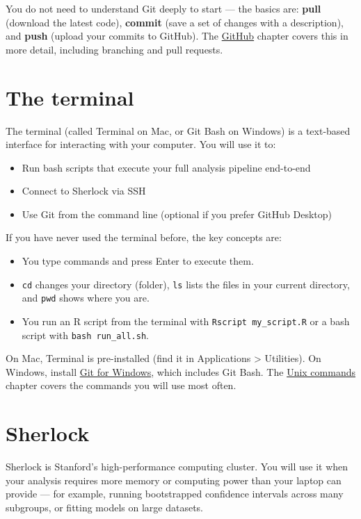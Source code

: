 \documentclass[
]{book}
\providecommand{\tightlist}{%
  \setlength{\itemsep}{0pt}\setlength{\parskip}{0pt}}
\begin{document}
You do not need to understand Git deeply to start --- the basics are: \textbf{pull} (download the latest code), \textbf{commit} (save a set of changes with a description), and \textbf{push} (upload your commits to GitHub). The \href{github.html}{GitHub} chapter covers this in more detail, including branching and pull requests.

\section{The terminal}\label{the-terminal}

The terminal (called Terminal on Mac, or Git Bash on Windows) is a text-based interface for interacting with your computer. You will use it to:

\begin{itemize}
\tightlist
\item
  Run bash scripts that execute your full analysis pipeline end-to-end
\item
  Connect to Sherlock via SSH
\item
  Use Git from the command line (optional if you prefer GitHub Desktop)
\end{itemize}

If you have never used the terminal before, the key concepts are:

\begin{itemize}
\tightlist
\item
  You type commands and press Enter to execute them.
\item
  \texttt{cd} changes your directory (folder), \texttt{ls} lists the files in your current directory, and \texttt{pwd} shows where you are.
\item
  You run an R script from the terminal with \texttt{Rscript\ my\_script.R} or a bash script with \texttt{bash\ run\_all.sh}.
\end{itemize}

On Mac, Terminal is pre-installed (find it in Applications \textgreater{} Utilities). On Windows, install \href{https://gitforwindows.org/}{Git for Windows}, which includes Git Bash. The \href{unix.html}{Unix commands} chapter covers the commands you will use most often.

\section{Sherlock}\label{sherlock}

Sherlock is Stanford's high-performance computing cluster. You will use it when your analysis requires more memory or computing power than your laptop can provide --- for example, running bootstrapped confidence intervals across many subgroups, or fitting models on large datasets.
\end{document}
